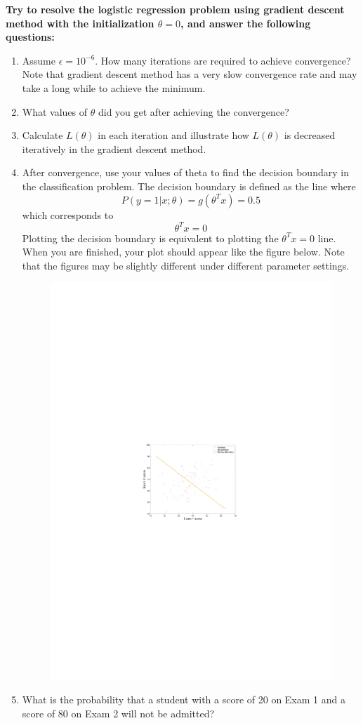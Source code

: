 \documentclass[10pt,a4paper]{article}
\begin{document}
  \textbf{Try to resolve the logistic regression problem using gradient descent method with the initialization $\theta=0$, and answer the following questions:}
  \begin{enumerate}
    \item Assume $\epsilon = 10^{-6}$. How many iterations are required to achieve convergence? Note that gradient descent method has a very slow convergence rate and may take a long while to achieve the minimum.
    \item What values of $\theta$ did you get after achieving the convergence?
    \item Calculate $L(\theta)$ in each iteration and illustrate how $L(\theta)$ is decreased iteratively in the gradient descent method.
    \item After convergence, use your values of theta to find the decision boundary in the classification problem. The decision boundary is defined as the line where 
    \begin{displaymath}
      P(y=1\vert x; \theta) = g(\theta^T x) = 0.5
    \end{displaymath}
    which corresponds to 
    \begin{displaymath}
      \theta^T x = 0
    \end{displaymath}
    Plotting the decision boundary is equivalent to plotting the  $\theta^T x = 0$ line. When you are finished, your plot should appear like the figure below. Note that the figures may be slightly different under different parameter settings.
    \begin{figure}[htb!]
    \centering
      \includegraphics[width=.7\columnwidth]{regression}
    \end{figure}
    \item What is the probability that a student with a score of 20 on Exam 1 and a score of 80 on Exam 2 will not be admitted?
    \end{enumerate}
\end{document}
